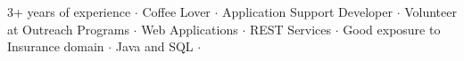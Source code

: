 

\begin{cvparagraph}
3+ years of experience ${\cdotp}$ Coffee Lover ${\cdotp}$ Application Support Developer ${\cdotp}$ Volunteer at Outreach Programs ${\cdotp}$ Web Applications ${\cdotp}$ REST Services ${\cdotp}$ Good exposure to Insurance domain ${\cdotp}$ Java and SQL ${\cdotp}$
\end{cvparagraph}
